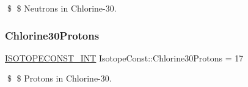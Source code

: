 \$ \$ Neutrons in Chlorine-\/30. \mbox{\label{group___isotope_const-_chlorine-_cl30_ga132d31c342f780b36d6b81198cb1f95d}} 
\subsubsection{\texorpdfstring{Chlorine30\+Protons}{Chlorine30Protons}}
{\footnotesize\ttfamily \mbox{\hyperlink{group___isotope_const-_macros_ga5f18360b3e99483a35c32d789e62621c}{I\+S\+O\+T\+O\+P\+E\+C\+O\+N\+S\+T\+\_\+\+I\+NT}} Isotope\+Const\+::\+Chlorine30\+Protons = 17}

\$ \$ Protons in Chlorine-\/30. 